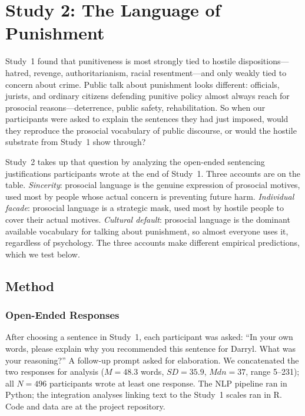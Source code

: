 \section{Study 2: The Language of Punishment}

Study~1 found that punitiveness is most strongly tied to hostile dispositions---hatred, revenge, authoritarianism, racial resentment---and only weakly tied to concern about crime. Public talk about punishment looks different: officials, jurists, and ordinary citizens defending punitive policy almost always reach for prosocial reasons---deterrence, public safety, rehabilitation. So when our participants were asked to explain the sentences they had just imposed, would they reproduce the prosocial vocabulary of public discourse, or would the hostile substrate from Study~1 show through?

Study~2 takes up that question by analyzing the open-ended sentencing justifications participants wrote at the end of Study~1. Three accounts are on the table. \textit{Sincerity}: prosocial language is the genuine expression of prosocial motives, used most by people whose actual concern is preventing future harm. \textit{Individual facade}: prosocial language is a strategic mask, used most by hostile people to cover their actual motives. \textit{Cultural default}: prosocial language is the dominant available vocabulary for talking about punishment, so almost everyone uses it, regardless of psychology. The three accounts make different empirical predictions, which we test below.

\subsection{Method}

\subsubsection{Open-Ended Responses}

After choosing a sentence in Study~1, each participant was asked: ``In your own words, please explain why you recommended this sentence for Darryl. What was your reasoning?'' A follow-up prompt asked for elaboration. We concatenated the two responses for analysis ($M = 48.3$ words, $SD = 35.9$, $\mathit{Mdn} = 37$, range 5--231); all $N = 496$ participants wrote at least one response. The NLP pipeline ran in Python; the integration analyses linking text to the Study~1 scales ran in R. Code and data are at the project repository.

